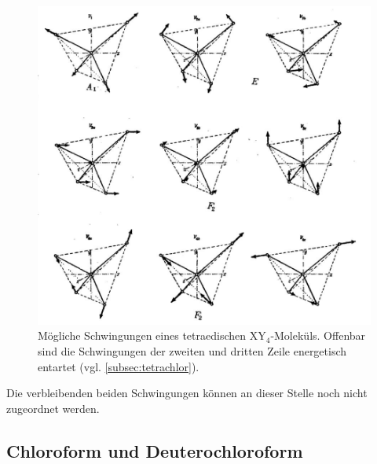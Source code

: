 \documentclass[../bericht.tex]{subfiles}
\begin{document}
        \begin{figure}[tbp]
          \includegraphics[width=\textwidth]{figures/tetraeder.png}
          \caption[Mögliche Schwingungen eines tetraedischen $\mathrm{XY_4}$-Moleküls.]{Mögliche Schwingungen eines tetraedischen $\mathrm{XY_4}$-Moleküls. Offenbar sind die Schwingungen der zweiten und dritten Zeile energetisch entartet (vgl. \cref{subsec:tetrachlor}). \cite{herzberg}}
          \label{fig:tetraeder-schwingungen}
        \end{figure}

        Die verbleibenden beiden Schwingungen können an dieser Stelle noch nicht zugeordnet werden.


      \subsection{Chloroform und Deuterochloroform}
\end{document}
